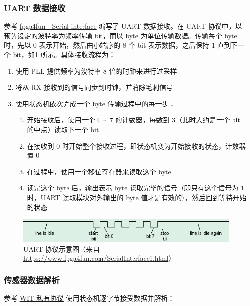 \documentclass[UTF8, 11pt, fontset=none]{ctexart}
\begin{document}
\subsubsection{UART 数据接收}

参考 \href{https://www.fpga4fun.com/SerialInterface.html}{fpga4fun - Serial interface} 编写了 UART 数据接收。在 UART 协议中，以预先设定的波特率为频率传输 bit，而以 byte 为单位传输数据。传输每个 byte 时，先以 0 表示开始，然后由小端序的 8 个 bit 表示数据，之后保持 1 直到下一个 bit，如\cref{uart} 所示。具体接收流程为：

\begin{enumerate}
    \item 使用 PLL 提供频率为波特率 8 倍的时钟来进行过采样
    \item 将从 RX 接收到的信号同步到时钟，并消除毛刺信号
    \item 使用状态机依次完成一个 byte 传输过程中的每一步：
        \begin{enumerate}
            \item 开始接收后，使用一个 $0 \sim 7$ 的计数器，每数到 3（此时大约是一个 bit 的中点）读取下一个 bit
            \item 在接收到 0 时开始整个接收过程，即状态机变为开始接收的状态，计数器置 0
            \item 在过程中，使用一个移位寄存器来读取这个 byte
            \item 读完这个 byte 后，输出表示 byte 读取完毕的信号（即只有这个信号为 1 时，UART 读取模块对外输出的 byte 值才是有效的），然后回到等待开始的状态
        \end{enumerate}
\end{enumerate}

\begin{figure}[H]
    \centering
    \includegraphics[width=\textwidth]{images/uart.png}
    \vspace{-16pt}
    \caption{UART 协议示意图（来自 \url{https://www.fpga4fun.com/SerialInterface1.html}）}
    \label{uart}
\end{figure}

\subsubsection{传感器数据解析}

参考 \href{https://wit-motion.yuque.com/wumwnr/ltst03/vl3tpy}{WIT 私有协议} 使用状态机逐字节接受数据并解析：
\end{document}
